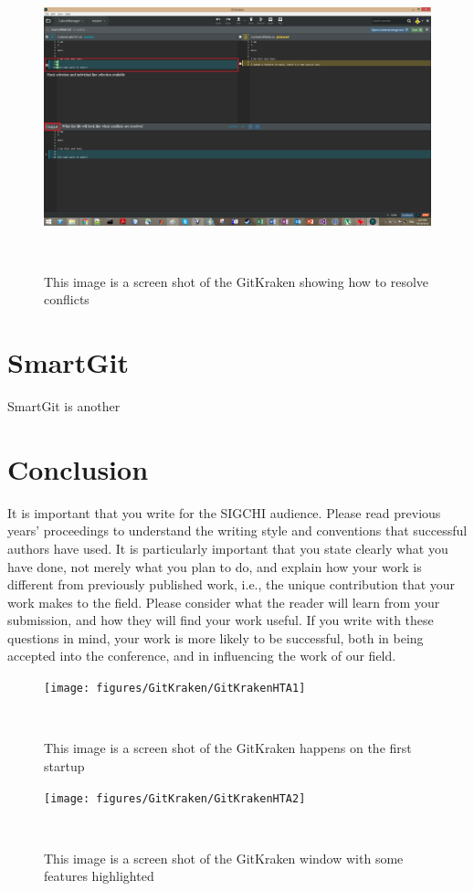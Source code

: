 \documentclass{sigchi}
\begin{document}
\begin{figure}
  \centering
  \includegraphics[width=1.75\columnwidth]{figures/GitKraken/MergeConflictResolution}
  \caption{This image is a screen shot of the GitKraken showing how to resolve conflicts}~\label{fig:GitKrakenFigure6}
\end{figure}

\section{SmartGit}
SmartGit is another



\section{Conclusion}
It is important that you write for the SIGCHI audience. Please read
previous years' proceedings to understand the writing style and
conventions that successful authors have used. It is particularly
important that you state clearly what you have done, not merely what
you plan to do, and explain how your work is different from previously
published work, i.e., the unique contribution that your work makes to
the field. Please consider what the reader will learn from your
submission, and how they will find your work useful. If you write with
these questions in mind, your work is more likely to be successful,
both in being accepted into the conference, and in influencing the
work of our field.

\begin{figure}
  \centering
  \texttt{[image: figures/GitKraken/GitKrakenHTA1]}
  \caption{This image is a screen shot of the GitKraken happens on the first startup}~\label{fig:GitKrakenHTA1}
\end{figure}

\begin{figure}
  \centering
  \texttt{[image: figures/GitKraken/GitKrakenHTA2]}
  \caption{This image is a screen shot of the GitKraken window with some features highlighted}~\label{fig:GitKrakenHTA2}
\end{figure}


\balance{}



\end{document}
